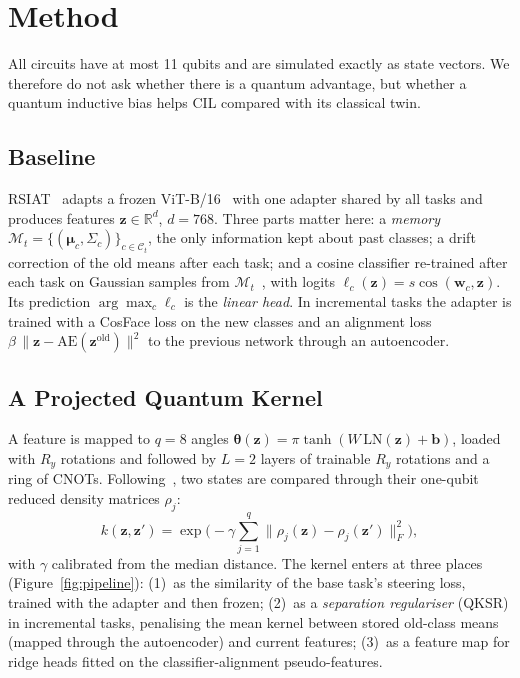 \section{Method}
\label{sec:method}

All circuits have at most 11 qubits and are simulated exactly as state
vectors. We therefore do not ask whether there is a quantum advantage, but
whether a quantum inductive bias helps CIL compared with its classical twin.

\subsection{Baseline}
\label{sec:baseline}
RSIAT~\citep{rsiat} adapts a frozen ViT-B/16~\citep{dosovitskiy2021vit} with
one adapter shared by all tasks and produces features $\mathbf z\in\mathbb R^{d}$,
$d=768$. Three parts matter here: a \emph{memory}
$\mathcal M_t=\{(\boldsymbol\mu_c,\Sigma_c)\}_{c\in\mathcal C_t}$, the only
information kept about past classes; a drift correction of the old means
after each task; and a cosine classifier re-trained after each task on
Gaussian samples from $\mathcal M_t$~\citep{zhang2023slca}, with logits
$\ell_c(\mathbf z)=s\cos(\mathbf w_c,\mathbf z)$. Its prediction
$\arg\max_c\ell_c$ is the \emph{linear head}. In incremental tasks the adapter
is trained with a CosFace loss on the new classes and an alignment loss
$\beta\,\|\mathbf z-\mathrm{AE}(\mathbf z^{\mathrm{old}})\|^2$ to the previous
network through an autoencoder.

\subsection{A Projected Quantum Kernel}
\label{sec:pqk}
A feature is mapped to $q=8$ angles
$\boldsymbol\theta(\mathbf z)=\pi\tanh(W\,\mathrm{LN}(\mathbf z)+\mathbf b)$,
loaded with $R_y$ rotations and followed by $L=2$ layers of trainable $R_y$
rotations and a ring of CNOTs. Following~\citet{huang2021power}, two states are
compared through their one-qubit reduced density matrices $\rho_j$:
\begin{equation}
  k(\mathbf z,\mathbf z')=\exp\Big(-\gamma\sum_{j=1}^{q}\big\|\rho_j(\mathbf z)-\rho_j(\mathbf z')\big\|_F^2\Big),
  \label{eq:pqk}
\end{equation}
with $\gamma$ calibrated from the median distance. The kernel enters at three
places (Figure~\ref{fig:pipeline}): (1)~as the similarity of the base task's
steering loss, trained with the adapter and then frozen; (2)~as a
\emph{separation regulariser} (QKSR) in incremental tasks, penalising the mean
kernel between stored old-class means (mapped through the autoencoder) and
current features; (3)~as a feature map for ridge heads fitted on the
classifier-alignment pseudo-features.

